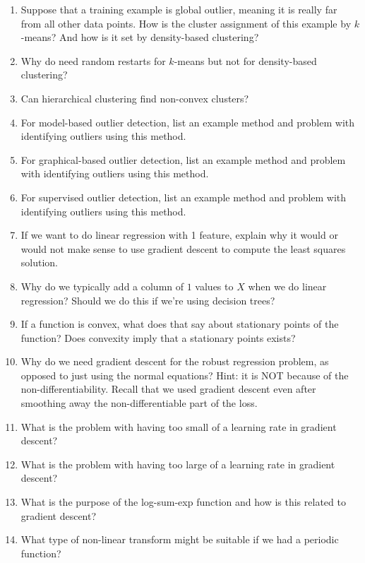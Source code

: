 \documentclass{article}
\begin{document}
\begin{enumerate}
\item Suppose that a training example is global outlier, meaning it is really far from all other data points. How is the cluster assignment of this example by $k$-means? And how is it set by density-based clustering?
\item Why do need random restarts for $k$-means but not for density-based clustering?
\item Can hierarchical clustering find non-convex clusters?
\item For model-based outlier detection, list an example method and problem with identifying outliers using this method.
\item For graphical-based outlier detection, list an example method and problem with identifying outliers using this method.
\item For supervised outlier detection, list an example method and problem with identifying outliers using this method.
\item If we want to do linear regression with 1 feature, explain why it would or would not make sense to use gradient descent to compute the least squares solution.
\item Why do we typically add a column of $1$ values to $X$ when we do linear regression? Should we do this if we're using decision trees?
\item If a function is convex, what does that say about stationary points of the function? Does convexity imply that a stationary points exists?
\item Why do we need gradient descent for the robust regression problem, as opposed to just using the normal equations? Hint: it is NOT because of the non-differentiability. Recall that we used gradient descent even after smoothing away the non-differentiable part of the loss.
\item What is the problem with having too small of a learning rate in gradient descent?
\item What is the problem with having too large of a learning rate in gradient descent?
\item What is the purpose of the log-sum-exp function and how is this related to gradient descent?
\item What type of non-linear transform might be suitable if we had a periodic function?
\end{enumerate}
\end{document}
